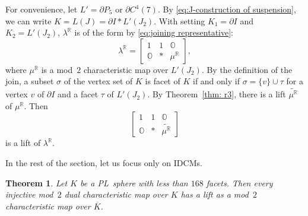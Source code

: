 \documentclass[11pt]{amsart}
\theoremstyle{plain}
\newtheorem{theorem}{Theorem}[section]
\numberwithin{equation}{section}
\theoremstyle{definition}
\newcommand{\R}{\mathbb{R}}
\begin{document}
For convenience, let $L' = \partial P_5$ or $ \partial C^4(7)$. 
By \eqref{eq:J-construction of suspension}, we can write $K = L(J) = \partial I \ast L'(J_2)$.
With setting $K_1 = \partial I$ and $K_2 = L'(J_2)$, $\lambda^\R$ is of the form by \eqref{eq:joining representative}: \begin{equation*}
    \lambda^\R = \begin{bmatrix}  1 & 1  & \mathds{O} \\
                                    \mathds{O} & \ast & \mu^\R \end{bmatrix},
      \end{equation*}
where $\mu^\R$ is a mod~$2$ characteristic map over $L'(J_2)$.
By the definition of the join, a subset $\sigma$ of the vertex set of $K$ is facet of $K$ if and only if $\sigma = \{v\} \cup \tau$ for a vertex $v$ of $\partial I$ and a facet $\tau$ of $L'(J_2)$.
By Theorem~\ref{thm: r3}, there is a lift $\widetilde{\mu^\R}$ of $\mu^\R$.
Then \begin{equation*}
    \begin{bmatrix}  1 & 1  & \mathds{O} \\
                                    \mathds{O} & \ast & \widetilde{\mu^\R} \end{bmatrix}
      \end{equation*}
is a lift of $\lambda^\R$.

In the rest of the section, let us focus only on IDCMs.

\begin{theorem} \label{theorem: 168}
    Let $K$ be a PL~sphere with less than $168$ facets.
    Then every injective mod~$2$ dual characteristic map over $K$ has a lift as a mod~$2$ characteristic map over $\overline{K}$.
\end{theorem}
\end{document}
